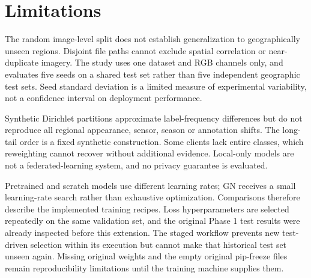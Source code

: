 \section{Limitations}
The random image-level split does not establish generalization to geographically unseen regions. Disjoint file paths cannot exclude spatial correlation or near-duplicate imagery. The study uses one dataset and RGB channels only, and evaluates five seeds on a shared test set rather than five independent geographic test sets. Seed standard deviation is a limited measure of experimental variability, not a confidence interval on deployment performance.

Synthetic Dirichlet partitions approximate label-frequency differences but do not reproduce all regional appearance, sensor, season or annotation shifts. The long-tail order is a fixed synthetic construction. Some clients lack entire classes, which reweighting cannot recover without additional evidence. Local-only models are not a federated-learning system, and no privacy guarantee is evaluated.

Pretrained and scratch models use different learning rates; GN receives a small learning-rate search rather than exhaustive optimization. Comparisons therefore describe the implemented training recipes. Loss hyperparameters are selected repeatedly on the same validation set, and the original Phase 1 test results were already inspected before this extension. The staged workflow prevents new test-driven selection within its execution but cannot make that historical test set unseen again. Missing original weights and the empty original pip-freeze files remain reproducibility limitations until the training machine supplies them.

